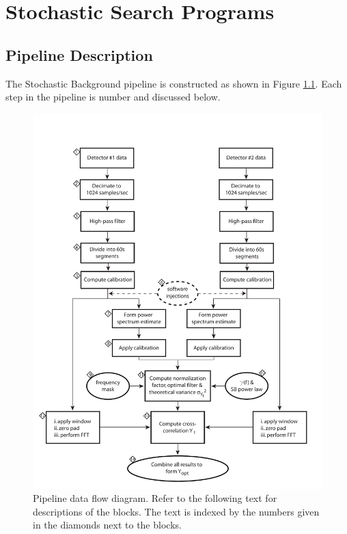 
\chapter{Stochastic Search Programs}
\label{chapter:stochastic}

\clearpage


\clearpage
\section{Pipeline Description}

The Stochastic Background pipeline is constructed as shown in Figure
\ref{fig:stoch_blockdigram}. Each step in the pipeline is number and
discussed below.

\begin{figure}[htb!]
\begin{center}
\includegraphics[width=5in]{figures/stochastic_flowdiagram}
\caption{Pipeline data flow diagram. Refer to the following text for
descriptions of the blocks. The text is indexed by the numbers given
in the diamonds next to the blocks.}
\label{fig:stoch_blockdigram}
\end{center}
\end{figure}

